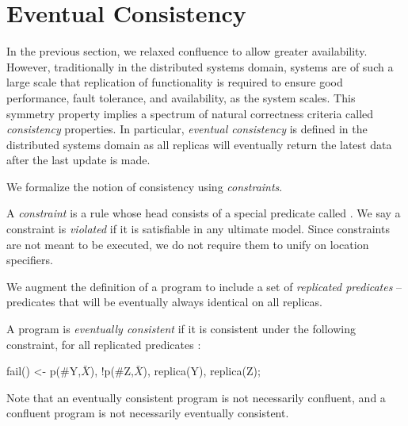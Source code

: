 \section{Eventual Consistency}

In the previous section, we relaxed confluence to allow greater availability.  However, traditionally in the distributed systems domain, systems are of such a large scale that replication of functionality is required to ensure good performance, fault tolerance, and availability, as the system scales.  This symmetry property implies a spectrum of natural correctness criteria called {\em consistency} properties.  In particular, {\em eventual consistency} is defined in the distributed systems domain as all replicas will eventually return the latest data after the last update is made.

We formalize the notion of consistency using {\em constraints}.

\begin{definition}
A {\em constraint} is a rule whose head consists of a special predicate called .  We say a constraint is {\em violated} if it is satisfiable in any ultimate model.  Since constraints are not meant to be executed, we do not require them to unify on location specifiers.
\end{definition}

We augment the definition of a \lang program to include a set of {\em replicated predicates} -- predicates that will be eventually always identical on all replicas.

\begin{definition}
\label{def:ec}
A \lang program is {\em eventually consistent} if it is consistent under the following constraint, for all replicated predicates :

\begin{Dedalus}
fail() <- p(#Y,\(\bar{X}\)), !p(#Z,\(\bar{X}\)), replica(Y), replica(Z);
\end{Dedalus}
\end{definition}

Note that an eventually consistent program is not necessarily confluent, and a confluent program is not necessarily eventually consistent.


